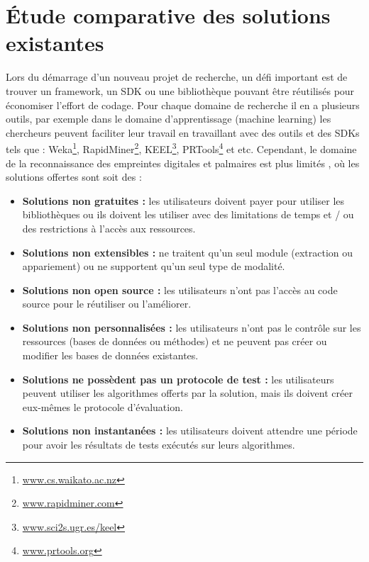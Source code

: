 \section{Étude comparative des solutions existantes}
Lors du démarrage d'un nouveau projet de recherche, un défi important est de trouver un framework, un SDK ou une bibliothèque pouvant être réutilisés pour économiser l'effort de codage. Pour chaque domaine de recherche il en a plusieurs outils, par exemple dans le domaine d'apprentissage (machine learning) les chercheurs peuvent faciliter leur travail en travaillant avec des outils et des SDKs tels que : Weka\footnote{\href{http://www.cs.waikato.ac.nz/ml/weka/}{www.cs.waikato.ac.nz}}, RapidMiner\footnote{\href{https://rapidminer.com/}{www.rapidminer.com}}, KEEL\footnote{\href{http://sci2s.ugr.es/keel/description.php}{www.sci2s.ugr.es/keel}}, PRTools\footnote{\href{http://prtools.org/}{www.prtools.org}} et etc. Cependant, le domaine de la reconnaissance des empreintes digitales et palmaires est plus limités \citep{maltoni2009handbook}, où les solutions offertes sont soit des :
\begin{itemize}
	\item \textbf{Solutions non gratuites :} les utilisateurs doivent payer pour utiliser les bibliothèques ou ils doivent les utiliser avec des limitations de temps et / ou des restrictions à l'accès aux ressources.
\item \textbf{Solutions non extensibles :} ne traitent qu'un seul module (extraction ou appariement) ou ne supportent qu'un seul type de modalité.

\item \textbf{Solutions non open source :} les utilisateurs n'ont pas l'accès au code source pour le réutiliser ou l'améliorer.

\item \textbf{Solutions non personnalisées :} les utilisateurs n'ont pas le contrôle sur les ressources (bases de données ou méthodes) et ne peuvent pas créer ou modifier les bases de données existantes.

\item \textbf{Solutions ne possèdent pas un protocole de test :} les utilisateurs peuvent utiliser les algorithmes offerts par la solution, mais ils doivent créer eux-mêmes le protocole d'évaluation.

\item \textbf{Solutions non instantanées :} les utilisateurs doivent attendre une période pour avoir les résultats de tests exécutés sur leurs algorithmes.
\end{itemize}

